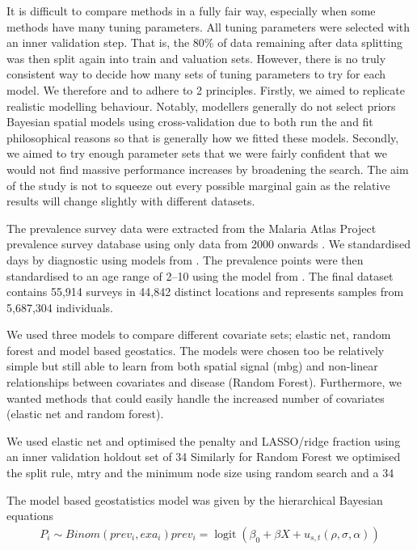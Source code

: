\documentclass{bmcart}
\begin{document}
It is difficult to compare methods in a fully fair way, especially when some methods have many tuning parameters.
All tuning parameters were selected with an inner validation step.
That is, the 80\% of data remaining after data splitting was then split again into train and valuation sets.
However, there is no truly consistent way to decide how many sets of tuning parameters to try for each model.
We therefore and to adhere to 2 principles.
Firstly, we aimed to replicate realistic modelling behaviour.
Notably, modellers generally do not select priors Bayesian spatial models using cross-validation due to both run the and fit philosophical reasons so that is generally how we fitted these models.
Secondly, we aimed to try enough parameter sets that we were fairly confident that we would not find massive performance increases by broadening the search.
The aim of the study is not to squeeze out every possible marginal gain as the relative results will change slightly with different datasets.


The prevalence survey data were extracted from the Malaria Atlas Project prevalence survey database using only data from 2000 onwards \cite{bhatt2015effect, guerra2007assembling, pfeffer2018ma}.
We standardised days by diagnostic using models from \cite{}.
The prevalence points were then standardised to an age range of 2--10 using the model from \cite{smith2007standardizing}.
The final dataset contains 55,914 surveys in 44,842 distinct locations and represents samples from 5,687,304 individuals.


We used three models to compare different covariate sets; elastic net, random forest and model based geostatics.
The models were chosen too be relatively simple but still able to learn from both spatial signal (mbg) and non-linear relationships between covariates and disease (Random Forest).
Furthermore, we wanted methods that could easily handle the increased number of covariates (elastic net and random forest).

We used elastic net \cite{enet} and optimised the penalty and LASSO/ridge fraction using an inner validation holdout set of 34%
Similarly for Random Forest we optimised the split rule, mtry and the minimum node size using random search and a 34%

The model based geostatistics model was given by the hierarchical Bayesian equations
\begin{align}
P_i \sim Binom(prev_i, exa_i)
prev_i = \operatorname{logit}\left(\beta_0 + \beta X + u_{s,t}\left(\rho, \sigma, \alpha\right)\right)
\end{align}
\end{document}
